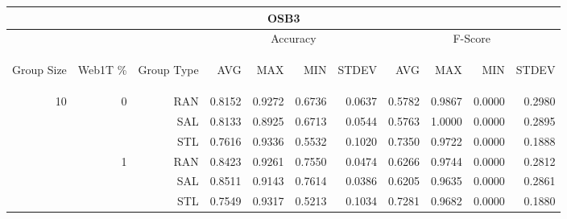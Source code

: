 \begin{center}
\begin{table}[htbp]
\begin{tabular}{ | r | r | r | r | r | r | r | r | r | r | r |}
\hline
\multicolumn{11}{|c|}{OSB3}\\
\hline
 & & & \multicolumn{4}{|c|}{Accuracy} & \multicolumn{4}{|c|}{F-Score}\\ \cline{4-11}
\begin{sideways}Group Size\end{sideways} & \begin{sideways}Web1T \%\end{sideways} & \begin{sideways}Group Type\end{sideways} & \begin{sideways}AVG\end{sideways} & \begin{sideways}MAX\end{sideways} & \begin{sideways}MIN\end{sideways} & \begin{sideways}STDEV\end{sideways} & \begin{sideways}AVG\end{sideways} & \begin{sideways}MAX\end{sideways} & \begin{sideways}MIN\end{sideways} & \begin{sideways}STDEV\end{sideways}\\
\hline
\multirow{18}{*}{10}
 & \multirow{3}{*}{0} & RAN & 0.8152 & 0.9272 & 0.6736 & 0.0637 & 0.5782 & 0.9867 & 0.0000 & 0.2980\\ \cline{3-11}
 &   & SAL & 0.8133 & 0.8925 & 0.6713 & 0.0544 & 0.5763 & 1.0000 & 0.0000 & 0.2895\\ \cline{3-11}
 &   & STL & 0.7616 & 0.9336 & 0.5532 & 0.1020 & 0.7350 & 0.9722 & 0.0000 & 0.1888\\ \cline{2-11}
 & \multirow{3}{*}{1} & RAN & 0.8423 & 0.9261 & 0.7550 & 0.0474 & 0.6266 & 0.9744 & 0.0000 & 0.2812\\ \cline{3-11}
 &   & SAL & 0.8511 & 0.9143 & 0.7614 & 0.0386 & 0.6205 & 0.9635 & 0.0000 & 0.2861\\ \cline{3-11}
 &   & STL & 0.7549 & 0.9317 & 0.5213 & 0.1034 & 0.7281 & 0.9682 & 0.0000 & 0.1880\\ \cline{2-11}

\end{tabular}
\end{table}
\end{center}
